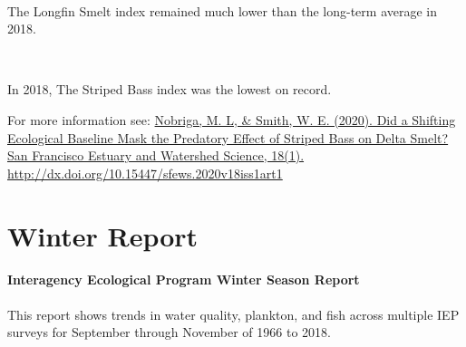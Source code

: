 \documentclass[
]{book}
\begin{document}
\begin{panel-grid}
\begin{columns-nocenter}
\begin{column40}

~

\end{column40}

\begin{column800}

The Longfin Smelt index remained much lower than the long-term average in 2018.

\end{column800}

\begin{column40}

~

\end{column40}

\begin{column800}

In 2018, The Striped Bass index was the lowest on record.

\end{column800}

\end{columns-nocenter}

\end{panel-grid}

\begin{disclaimer}
For more information see:
\href{http://dx.doi.org/10.15447/sfews.2020v18iss1art1}{Nobriga, M. L,
\& Smith, W. E. (2020). Did a Shifting Ecological Baseline Mask the
Predatory Effect of Striped Bass on Delta Smelt? San Francisco Estuary
and Watershed Science, 18(1).}
\url{http://dx.doi.org/10.15447/sfews.2020v18iss1art1}
\end{disclaimer}

\hypertarget{Winter}{%
\chapter{Winter Report}\label{Winter}}

\hypertarget{interagency-ecological-program-winter-season-report}{%
\subsubsection{Interagency Ecological Program Winter Season Report}\label{interagency-ecological-program-winter-season-report}}

This report shows trends in water quality, plankton, and fish across multiple IEP
surveys for September through November of 1966 to 2018.
\end{document}

